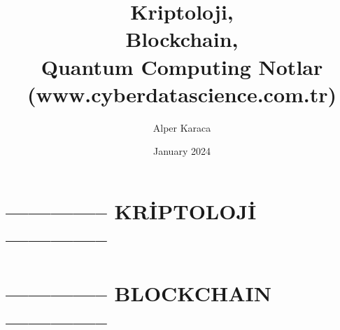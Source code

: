 \documentclass{article}
\title{Kriptoloji, \\Blockchain, \\Quantum Computing Notlar (www.cyberdatascience.com.tr)}
\author{Alper Karaca}
\date{January 2024}
\begin{document}
\maketitle

\newpage
\tableofcontents
\newpage

\section{-------------- KRİPTOLOJİ --------------}












\section{-------------- BLOCKCHAIN --------------}
















\end{document}
